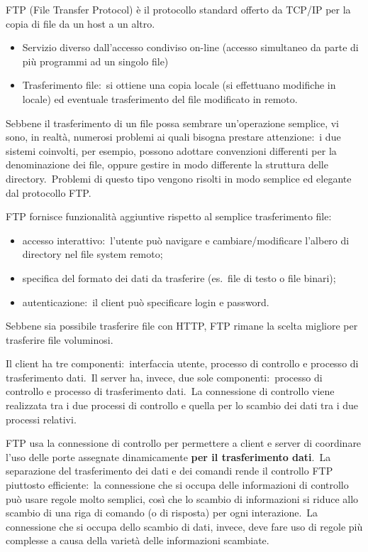 FTP (File Transfer Protocol) è il protocollo standard offerto da TCP/IP per la copia di file da un host a un altro.

\begin{itemize}
    \item Servizio diverso dall'accesso condiviso on-line (accesso simultaneo da parte di più programmi ad un singolo file)
    \item Trasferimento file:\ si ottiene una copia locale (si effettuano modifiche in locale) ed eventuale trasferimento del file modificato in remoto.
\end{itemize}
Sebbene il trasferimento di un file possa sembrare un'operazione semplice, vi sono, in realtà, numerosi problemi ai quali bisogna prestare attenzione:\ i due sistemi coinvolti, per esempio, possono adottare convenzioni differenti per la denominazione dei file, oppure gestire in modo differente la struttura delle directory.\
Problemi di questo tipo vengono risolti in modo semplice ed elegante dal protocollo FTP.

FTP fornisce funzionalità aggiuntive rispetto al semplice trasferimento file:

\begin{itemize}
    \item accesso interattivo:\ l'utente può navigare e cambiare/modificare l'albero di directory nel file system remoto;
    \item specifica del formato dei dati da trasferire (es.\ file di testo o file binari);
    \item autenticazione:\ il client può specificare login e password.
\end{itemize}

Sebbene sia possibile trasferire file con HTTP, FTP rimane la scelta migliore per trasferire file voluminosi.

Il client ha tre componenti:\ interfaccia utente, processo di controllo e processo di trasferimento dati.\
Il server ha, invece, due sole componenti:\ processo di controllo e processo di trasferimento dati.\
La connessione di controllo viene realizzata tra i due processi di controllo e quella per lo scambio dei dati tra i due processi relativi.

FTP usa la connessione di controllo per permettere a client e server di coordinare l'uso delle porte assegnate dinamicamente \textbf{per il trasferimento dati}.\
La separazione del trasferimento dei dati e dei comandi rende il controllo FTP piuttosto efficiente:\ la connessione che si occupa delle informazioni di controllo può usare regole molto semplici, così che lo scambio di informazioni si riduce allo scambio di una riga di comando (o di risposta) per ogni interazione.\
La connessione che si occupa dello scambio di dati, invece, deve fare uso di regole più complesse a causa della varietà delle informazioni scambiate.

